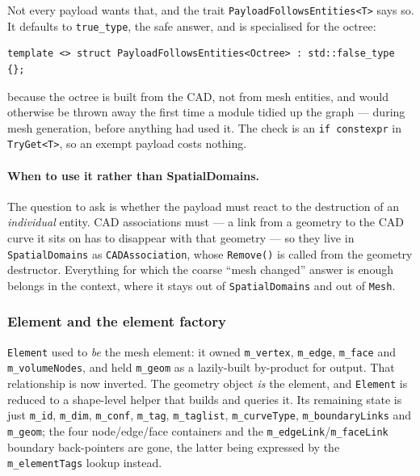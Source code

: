 Not every payload wants that, and the trait
\texttt{PayloadFollowsEntities<T>} says so. It defaults to
\texttt{true\_type}, the safe answer, and is specialised for the
octree:

\begin{lstlisting}[style=BashInputStyle]
template <> struct PayloadFollowsEntities<Octree> : std::false_type {};
\end{lstlisting}

\noindent because the octree is built from the CAD, not from mesh
entities, and would otherwise be thrown away the first time a module
tidied up the graph --- during mesh generation, before anything had
used it. The check is an \texttt{if constexpr} in
\texttt{TryGet<T>}, so an exempt payload costs nothing.

\paragraph{When to use it rather than SpatialDomains.} The question to
ask is whether the payload must react to the destruction of an
\textit{individual} entity. CAD associations must --- a link from a
geometry to the CAD curve it sits on has to disappear with that
geometry --- so they live in \texttt{SpatialDomains} as
\texttt{CADAssociation}, whose \texttt{Remove()} is called from the
geometry destructor. Everything for which the coarse ``mesh changed''
answer is enough belongs in the context, where it stays out of
\texttt{SpatialDomains} and out of \texttt{Mesh}.

\subsubsection{Element and the element factory}
\texttt{Element} used to \textit{be} the mesh element: it owned
\texttt{m\_vertex}, \texttt{m\_edge}, \texttt{m\_face} and
\texttt{m\_volumeNodes}, and held \texttt{m\_geom} as a lazily-built
by-product for output. That relationship is now inverted. The geometry
object \textit{is} the element, and \texttt{Element} is reduced to a
shape-level helper that builds and queries it. Its remaining state is
just \texttt{m\_id}, \texttt{m\_dim}, \texttt{m\_conf},
\texttt{m\_tag}, \texttt{m\_taglist}, \texttt{m\_curveType},
\texttt{m\_boundaryLinks} and \texttt{m\_geom}; the four node/edge/face
containers and the \texttt{m\_edgeLink}/\texttt{m\_faceLink} boundary
back-pointers are gone, the latter being expressed by the
\texttt{m\_elementTags} lookup instead.

